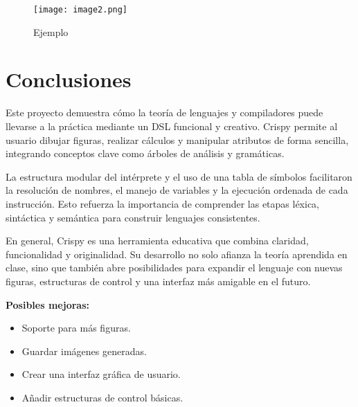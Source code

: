 \documentclass[12pt]{article}
\begin{document}
\begin{figure}
            \centering
            \texttt{[image: image2.png]}
            \caption{Ejemplo}
            \label{fig:enter-label}
        \end{figure}
\section{Conclusiones}

Este proyecto demuestra cómo la teoría de lenguajes y compiladores puede llevarse a la práctica mediante un DSL funcional y creativo. Crispy permite al usuario dibujar figuras, realizar cálculos y manipular atributos de forma sencilla, integrando conceptos clave como árboles de análisis y gramáticas.

La estructura modular del intérprete y el uso de una tabla de símbolos facilitaron la resolución de nombres, el manejo de variables y la ejecución ordenada de cada instrucción. Esto refuerza la importancia de comprender las etapas léxica, sintáctica y semántica para construir lenguajes consistentes.

En general, Crispy es una herramienta educativa que combina claridad, funcionalidad y originalidad. Su desarrollo no solo afianza la teoría aprendida en clase, sino que también abre posibilidades para expandir el lenguaje con nuevas figuras, estructuras de control y una interfaz más amigable en el futuro.

\textbf{Posibles mejoras:}
\begin{itemize}
    \item Soporte para más figuras.
    \item Guardar imágenes generadas.
    \item Crear una interfaz gráfica de usuario.
    \item Añadir estructuras de control básicas.
\end{itemize}
\end{document}
